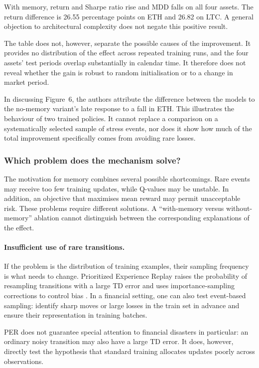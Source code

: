 \documentclass[9pt,a4paper,twocolumn]{extarticle}
\begin{document}
With memory, return and Sharpe ratio rise and MDD falls on all four assets. The return difference
is 26.55 percentage points on ETH and 26.82 on LTC. A general objection to architectural
complexity does not negate this positive result.

The table does not, however, separate the possible causes of the improvement. It provides no
distribution of the effect across repeated training runs, and the four assets' test periods
overlap substantially in calendar time. It therefore does not reveal whether the gain is robust
to random initialisation or to a change in market period.

In discussing Figure~6, the authors attribute the difference between the models to the no-memory
variant's late response to a fall in ETH. This illustrates the behaviour of two trained policies.
It cannot replace a comparison on a systematically selected sample of stress events, nor does it
show how much of the total improvement specifically comes from avoiding rare losses.

\subsubsection{Which problem does the mechanism solve?}

The motivation for memory combines several possible shortcomings. Rare events may receive too
few training updates, while Q-values may be unstable. In addition, an objective that maximises
mean reward may permit unacceptable risk. These problems require different solutions. A
``with-memory versus without-memory'' ablation cannot distinguish between the corresponding
explanations of the effect.

\paragraph{Insufficient use of rare transitions.}

If the problem is the distribution of training examples, their sampling frequency is what needs
to change. Prioritized Experience Replay raises the probability of resampling transitions with a
large TD error and uses importance-sampling corrections to control bias
\cite{schaul2016prioritized}. In a financial setting, one can also test event-based sampling:
identify sharp moves or large losses in the train set in advance and ensure their representation
in training batches.

PER does not guarantee special attention to financial disasters in particular: an ordinary noisy
transition may also have a large TD error. It does, however, directly test the hypothesis that
standard training allocates updates poorly across observations.
\end{document}
